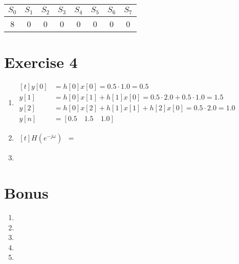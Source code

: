 \documentclass[12pt]{article}
\begin{document}
\begin{tabular}{*{8}{|c}|}
\hline
$S_0$ & $S_1$ & $S_2$ & $S_3$ & $S_4$ & $S_5$ & $S_6$ & $S_7$ \\
 & 0 & 0 & 0 & 0 & 0 & 0 & 0\\
\hline
\end{tabular}


\section*{Exercise 4}
\begin{enumerate}[label=\alph*)]
\item 
$\begin{aligned}[t]
y[0] &= h[0]x[0] = 0.5 \cdot 1.0 = 0.5 \\
y[1] &= h[0]x[1] + h[1]x[0] = 0.5 \cdot 2.0 + 0.5\cdot 1.0 = 1.5 \\
y[2] &= h[0]x[2] + h[1]x[1] + h[2]x[0] = 0.5\cdot2.0 = 1.0 \\
y[n] &= [0.5\quad1.5\quad1.0]
\end{aligned}$

\item
$\begin{aligned}[t]
H(e^{-j\omega}) &= 
\end{aligned}$

\item 

\end{enumerate}

\section*{Bonus}
\begin{enumerate}
\item 

\item

\item

\item

\item

\end{enumerate}
\end{document}
